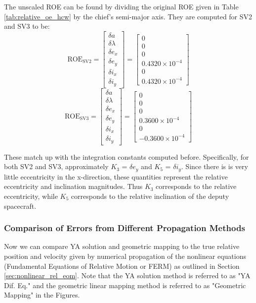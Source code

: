The unscaled ROE can be found by dividing the original ROE given in Table \ref{tab:relative_oe_hcw} by the chief's semi-major axis. They are computed for SV2 and SV3 to be:
\[
\text{ROE}_{\text{SV2}} = 
\begin{bmatrix}
\delta a \\ \delta \lambda \\ \delta e_x \\ \delta e_y \\ \delta i_x \\ \delta i_y
\end{bmatrix} =
\begin{bmatrix}
0 \\
0 \\
0 \\
0.4320 \times 10^{-4} \\
0 \\
0.4320 \times 10^{-4}
\end{bmatrix}
\]
\[
\text{ROE}_{\text{SV3}} = 
\begin{bmatrix}
\delta a \\ \delta \lambda \\ \delta e_x \\ \delta e_y \\ \delta i_x \\ \delta i_y
\end{bmatrix} =
\begin{bmatrix}
0 \\
0 \\
0 \\
0.3600 \times 10^{-4} \\
0 \\
-0.3600 \times 10^{-4}
\end{bmatrix}
\]

These match up with the integration constants computed before. Specifically, for both SV2 and SV3, approximately $K_3$ = $\delta e_y$ and $K_5$ = $\delta i_y$. Since there is is very little eccentricity in the x-direction, these quantities represent the relative eccentricity and inclination magnitudes. Thus $K_3$ corresponds to the relative eccentricity, while $K_5$ corresponds to the relative inclination of the deputy spacecraft. 


\subsubsection{Comparison of Errors from Different Propagation Methods}
Now we can compare YA solution and geometric mapping to the true relative position and velocity given by numerical propagation of the nonlinear equations (Fundamental Equations of Relative Motion or FERM) as outlined in Section \ref{sec:nonlinear_rel_eom}. Note that the YA solution method is referred to as "YA Dif. Eq." and the geometric linear mapping method is referred to as "Geometric Mapping" in the Figures. 

